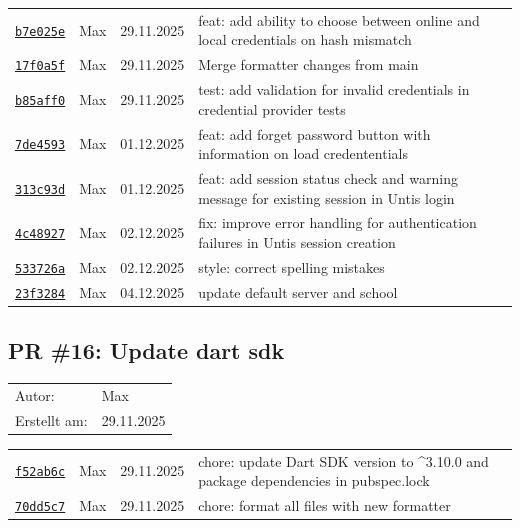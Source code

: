 \documentclass{article}%
\begin{document}
\begin{longtable}{l l l p{12cm}}
\href{https://github.com/scriptor1000/homeworks/pull/17/commits/b7e025e66dda69e54c0dd3ea8d6bc1f20dbaee9b}{\underline{\texttt{b7e025e}}}&Max&29.11.2025&feat: add ability to choose between online and local credentials on hash mismatch\\%
\href{https://github.com/scriptor1000/homeworks/pull/17/commits/17f0a5f9a25e6505768636d11e9e8a675e4a29b8}{\underline{\texttt{17f0a5f}}}&Max&29.11.2025&Merge formatter changes from main\\%
\href{https://github.com/scriptor1000/homeworks/pull/17/commits/b85aff0b18c2d5e3447087350c6ce698e0193ad9}{\underline{\texttt{b85aff0}}}&Max&29.11.2025&test: add validation for invalid credentials in credential provider tests\\%
\href{https://github.com/scriptor1000/homeworks/pull/17/commits/7de4593c17decbc8ae41644a28b7b6b9246e218d}{\underline{\texttt{7de4593}}}&Max&01.12.2025&feat: add forget password button with information on load credententials\\%
\href{https://github.com/scriptor1000/homeworks/pull/17/commits/313c93d937b5585269425f29fb3af12ab90e5670}{\underline{\texttt{313c93d}}}&Max&01.12.2025&feat: add session status check and warning message for existing session in Untis login\\%
\href{https://github.com/scriptor1000/homeworks/pull/17/commits/4c48927e26bc7ffee337886ab9d77240460262b4}{\underline{\texttt{4c48927}}}&Max&02.12.2025&fix: improve error handling for authentication failures in Untis session creation\\%
\href{https://github.com/scriptor1000/homeworks/pull/17/commits/533726a12fe85ddbc7f654319035226d733a1ed3}{\underline{\texttt{533726a}}}&Max&02.12.2025&style: correct spelling mistakes\\%
\href{https://github.com/scriptor1000/homeworks/pull/17/commits/23f328462268258f5ecde0a10f532351c161e782}{\underline{\texttt{23f3284}}}&Max&04.12.2025&update default server and school\\%
\end{longtable}

%
\subsection{PR \#16: Update dart sdk}%
\label{pr:16}%
\begin{tabular}{l l}%
Autor:&Max\\%
Erstellt am: &29.11.2025\\%
\end{tabular}%
\begin{longtable}{l l l p{12cm}}%
\href{https://github.com/scriptor1000/homeworks/pull/16/commits/f52ab6c9b2f76081ad1173cd2813db8e9f689b59}{\underline{\texttt{f52ab6c}}}&Max&29.11.2025&chore: update Dart SDK version to \^{}3.10.0 and package dependencies in pubspec.lock\\%
\href{https://github.com/scriptor1000/homeworks/pull/16/commits/70dd5c725316849a40a291028dfe3022afe1d847}{\underline{\texttt{70dd5c7}}}&Max&29.11.2025&chore: format all files with new formatter\\%
\end{longtable}
\end{document}
